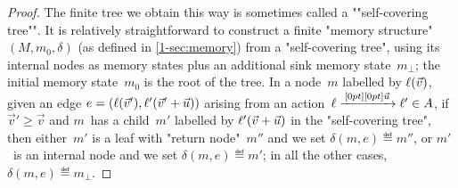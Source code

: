 \begin{proof}
  The finite tree we obtain this way is sometimes called a
  ""self-covering tree"".  %
  It is relatively straightforward to construct a finite "memory
  structure"~$(M,m_0,\delta)$ (as defined in \cref{1-sec:memory}) from a
  "self-covering tree", using its internal nodes as memory states plus
  an additional sink memory state~$m_\bot$; the initial memory
  state~$m_0$ is the root of the tree.  In a node~$m$ labelled by
  $\ell(\vec v)$, given an edge
  $e=(\ell(\vec v'),\ell'(\vec v'+\vec u))$ arising from an
  action~$\ell\xrightarrow{\,[0pt][0pt]{\scriptsize{\vec u}}\,}\ell'\in A$, if $\vec v'\geq\vec v$ and
  $m$~has a child~$m'$ labelled by $\ell'(\vec v+\vec u)$ in the
  "self-covering tree", then either~$m'$ is a leaf with "return
  node"~$m''$ and we set $\delta(m,e)\eqdef m''$, or $m'$~is an
  internal node and we set $\delta(m,e)\eqdef m'$; in all the other
  cases, $\delta(m,e)\eqdef m_\bot$. %
\end{proof}

